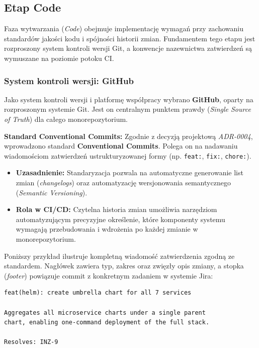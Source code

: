 \subsection{Etap Code}
Faza wytwarzania (\textit{Code}) obejmuje implementację wymagań przy zachowaniu standardów jakości kodu i spójności historii zmian. Fundamentem tego etapu jest rozproszony system kontroli wersji Git, a konwencje nazewnictwa zatwierdzeń są wymuszane na poziomie potoku CI.

\subsubsection{System kontroli wersji: GitHub}
Jako system kontroli wersji i platformę współpracy wybrano \textbf{GitHub}, oparty na rozproszonym systemie Git. Jest on centralnym punktem prawdy (\textit{Single Source of Truth}) dla całego monorepozytorium.

\textbf{Standard Conventional Commits:}
Zgodnie z decyzją projektową \textit{ADR-0004}, wprowadzono standard \textbf{Conventional Commits}. Polega on na nadawaniu wiadomościom zatwierdzeń ustrukturyzowanej formy (np. \texttt{feat:}, \texttt{fix:}, \texttt{chore:}).
\begin{itemize}
    \item \textbf{Uzasadnienie:} Standaryzacja pozwala na automatyczne generowanie list zmian (\textit{changelogs}) oraz automatyzację wersjonowania semantycznego (\textit{Semantic Versioning}).
    \item \textbf{Rola w CI/CD:} Czytelna historia zmian umożliwia narzędziom automatyzującym precyzyjne określenie, które komponenty systemu wymagają przebudowania i wdrożenia po każdej zmianie w monorepozytorium.
\end{itemize}

Poniższy przykład ilustruje kompletną wiadomość zatwierdzenia zgodną ze standardem. Nagłówek zawiera typ, zakres oraz zwięzły opis zmiany, a stopka (\textit{footer}) powiązuje commit z konkretnym zadaniem w systemie Jira:

\begin{lstlisting}[caption={Przykład wiadomości zatwierdzenia zgodnej ze standardem Conventional Commits}, label={lst:conventional-commit}]
feat(helm): create umbrella chart for all 7 services

Aggregates all microservice charts under a single parent
chart, enabling one-command deployment of the full stack.

Resolves: INZ-9
\end{lstlisting}

